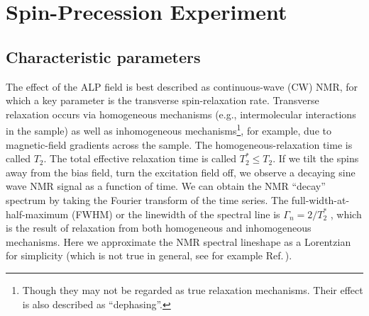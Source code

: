 \section{Spin-Precession Experiment}\label{sec:Spin-PrecessionExperiment}

\subsection{Characteristic parameters}

The effect of the ALP field is best described as continuous-wave (CW) NMR, for which a key parameter is the transverse spin-relaxation rate. 
Transverse relaxation occurs via homogeneous mechanisms (e.g., intermolecular interactions in the sample) as well as inhomogeneous mechanisms\footnote{Though they may not be regarded as true relaxation mechanisms. Their effect is also described as ``dephasing''. }, for example, due to magnetic-field gradients across the sample. 
The homogeneous-relaxation time is called $T_2$. 
The total effective relaxation time is called $T_2^*\leq T_2$.
If we tilt the spins away from the bias field, turn the excitation field off, we observe a decaying sine wave NMR signal as a function of time. We can obtain the NMR ``decay'' spectrum by taking the Fourier transform of the time series. 
The full-width-at-half-maximum (FWHM) or the linewidth of the spectral line is $\Gamma_{n} = 2/T_2^*$ \cite{Levitt2008SpinDynamics}, which is the result of relaxation from both homogeneous and inhomogeneous mechanisms. Here we approximate the NMR spectral lineshape as a Lorentzian for simplicity (which is not true in general, see for example Ref.\,\cite{Aybas_2021_Solid-StateNMR}).
